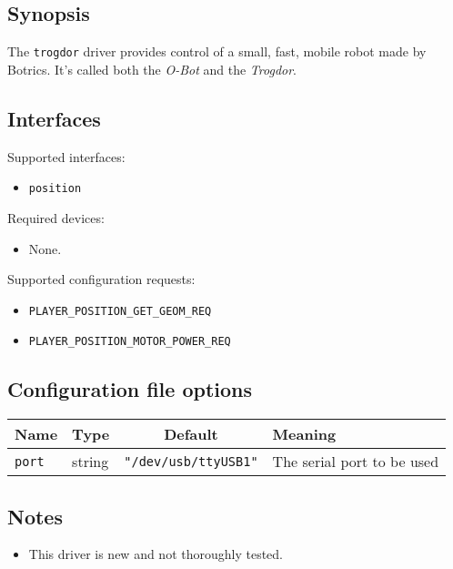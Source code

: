 \subsection*{Synopsis}
The {\tt trogdor} driver provides control of a small, fast, mobile robot
made by Botrics.  It's called both the {\em O-Bot} and the {\em Trogdor}.

\subsection*{Interfaces}

\noindent Supported interfaces:
\begin{itemize}
\item {\tt position}
\end{itemize}

\noindent Required devices:
\begin{itemize}
\item None.
\end{itemize}

\noindent Supported configuration requests:
\begin{itemize}
\item {\tt PLAYER\_POSITION\_GET\_GEOM\_REQ}
\item {\tt PLAYER\_POSITION\_MOTOR\_POWER\_REQ}
\end{itemize}

\subsection*{Configuration file options}

\begin{center}
{\small \begin{tabularx}{\columnwidth}{|l|l|c|X|}
\hline
Name & Type & Default & Meaning\\
\hline
{\tt port} & string & {\tt "/dev/usb/ttyUSB1"} & The serial port to be used\\
\hline
\end{tabularx}}
\end{center}


\subsection*{Notes}
\begin{itemize}
\item This driver is new and not thoroughly tested.
\end{itemize}
